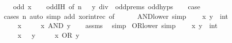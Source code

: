 \begin{isabellebody}
\isamarkupfalse%
\isanewline
\ \ \isamarkupfalse%
\ {\isacharparenleft}{\kern0pt}odd\ x{\isacharparenright}{\kern0pt}\isanewline
\ \ \isamarkupfalse%
\ odd{\isachardot}{\kern0pt}IH\ {\isacharbrackleft}{\kern0pt}of\ {\isacartoucheopen}n\ {\isacharminus}{\kern0pt}\ {}{\isacartoucheclose}\ {\isacartoucheopen}y\ div\ {}{\isacartoucheclose}{\isacharbrackright}{\kern0pt}\ odd{\isachardot}{\kern0pt}prems\ odd{\isachardot}{\kern0pt}hyps\isanewline
\ \ \isamarkupfalse%
\ {\isacharquery}{\kern0pt}case\isanewline
\ \ \ \ \isamarkupfalse%
\ {\isacharparenleft}{\kern0pt}cases\ n{\isacharparenright}{\kern0pt}\ {\isacharparenleft}{\kern0pt}auto\ simp\ add{\isacharcolon}{\kern0pt}\ xor{\isacharunderscore}{\kern0pt}int{\isacharunderscore}{\kern0pt}rec\ {\isacharbrackleft}{\kern0pt}of\ {\isacartoucheopen}{}\ {\isacharplus}{\kern0pt}\ {\isacharunderscore}{\kern0pt}\ {\isacharasterisk}{\kern0pt}\ {}{\isacartoucheclose}{\isacharbrackright}{\kern0pt}{\isacharparenright}{\kern0pt}\isanewline
{}\isamarkupfalse%
%
\endisatagproof
{\isafoldproof}%
%
\isadelimproof
\isanewline
%
\endisadelimproof
\isanewline
{}\isamarkupfalse%
\ AND{\isacharunderscore}{\kern0pt}lower\ {\isacharbrackleft}{\kern0pt}simp{\isacharbrackright}{\kern0pt}{\isacharcolon}{\kern0pt}\ \isanewline
\ \ \ x\ y\ {\isacharcolon}{\kern0pt}{\isacharcolon}{\kern0pt}\ int\isanewline
\ \ \ {\isacartoucheopen}{}\ {\isasymle}\ x{\isacartoucheclose}\isanewline
\ \ \ {\isacartoucheopen}{}\ {\isasymle}\ x\ AND\ y{\isacartoucheclose}\isanewline
%
\isadelimproof
\ \ %
\endisadelimproof
%
\isatagproof
{}\isamarkupfalse%
\ assms\ \isamarkupfalse%
\ simp%
\endisatagproof
{\isafoldproof}%
%
\isadelimproof
\isanewline
%
\endisadelimproof
\isanewline
{}\isamarkupfalse%
\ OR{\isacharunderscore}{\kern0pt}lower\ {\isacharbrackleft}{\kern0pt}simp{\isacharbrackright}{\kern0pt}{\isacharcolon}{\kern0pt}\ \isanewline
\ \ \ x\ y\ {\isacharcolon}{\kern0pt}{\isacharcolon}{\kern0pt}\ int\isanewline
\ \ \ {\isacartoucheopen}{}\ {\isasymle}\ x{\isacartoucheclose}\ {\isacartoucheopen}{}\ {\isasymle}\ y{\isacartoucheclose}\isanewline
\ \ \ {\isacartoucheopen}{}\ {\isasymle}\ x\ OR\ y{\isacartoucheclose}\isanewline
%
\isadelimproof
\ \ %
\endisadelimproof
%
\isatagproof
{}\isamarkupfalse%

\end{isabellebody}
